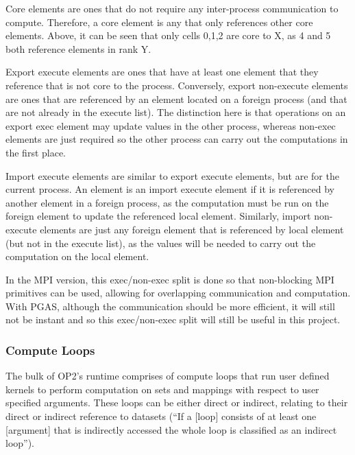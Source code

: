 Core elements are ones that do not require any inter-process communication to compute. Therefore, a core element is any that only references other core elements. Above, it can be seen that only cells 0,1,2 are core to X, as 4 and 5 both reference elements in rank Y.

Export execute elements are ones that have at least one element that they reference that is not core to the process. Conversely, export non-execute elements are ones that are referenced by an element located on a foreign process (and that are not already in the execute list). The distinction here is that operations on an export exec element may update values in the other process, whereas non-exec elements are just required so the other process can carry out the computations in the first place.

Import execute elements are similar to export execute elements, but are for the current process. An element is an import execute element if it is referenced by another element in a foreign process, as the computation must be run on the foreign element to update the referenced local element. Similarly, import non-execute elements are just any foreign element that is referenced by local element (but not in the execute list), as the values will be needed to carry out the computation on the local element. 

In the MPI version, this exec/non-exec split is done so that non-blocking MPI primitives can be used, allowing for overlapping communication and computation. With PGAS, although the communication should be more efficient, it will still not be instant and so this exec/non-exec split will still be useful in this project. %

\subsubsection{Compute Loops} %

The bulk of OP2's runtime comprises of compute loops that run user defined kernels to perform computation on sets and mappings with respect to user specified arguments. These loops can be either direct or indirect, relating to their direct or indirect reference to datasets (``If a [loop] consists of at least one [argument] that is indirectly accessed the whole loop is classified as an indirect loop'').

